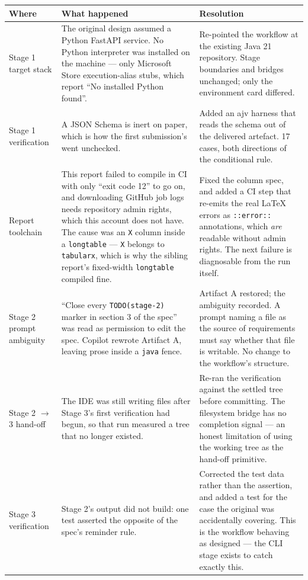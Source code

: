 \documentclass[11pt,a4paper]{article}
\newcommand{\code}[1]{\texttt{\small #1}}
\begin{document}
\begin{table}[h]
\centering
\small
\begin{tabularx}{\textwidth}{@{}L{3.4cm} X L{3.6cm}@{}}
\toprule
\textbf{Where} & \textbf{What happened} & \textbf{Resolution} \\
\midrule
Stage 1 target stack
  & The original design assumed a Python FastAPI service. No Python
    interpreter was installed on the machine --- only Microsoft Store
    execution-alias stubs, which report ``No installed Python found''.
  & Re-pointed the workflow at the existing Java 21 repository. Stage
    boundaries and bridges unchanged; only the environment card differed. \\
\addlinespace
Stage 1 verification
  & A JSON Schema is inert on paper, which is how the first submission's went
    unchecked.
  & Added an ajv harness that reads the schema out of the delivered artefact.
    17 cases, both directions of the conditional rule. \\
\addlinespace
Report toolchain
  & This report failed to compile in CI with only ``exit code 12'' to go on,
    and downloading GitHub job logs needs repository admin rights, which this
    account does not have. The cause was an \code{X} column inside a
    \code{longtable} --- \code{X} belongs to \code{tabularx}, which is why the
    sibling report's fixed-width \code{longtable} compiled fine.
  & Fixed the column spec, and added a CI step that re-emits the real LaTeX
    errors as \code{::error::} annotations, which \emph{are} readable without
    admin rights. The next failure is diagnosable from the run itself. \\
\addlinespace
Stage 2 prompt ambiguity
  & ``Close every \code{TODO(stage-2)} marker in section 3 of the spec'' was
    read as permission to edit the spec. Copilot rewrote Artifact A, leaving
    prose inside a \code{java} fence.
  & Artifact A restored; the ambiguity recorded. A prompt naming a file as the
    source of requirements must say whether that file is writable. No change to
    the workflow's structure. \\
\addlinespace
Stage 2 $\rightarrow$ 3 hand-off
  & The IDE was still writing files after Stage 3's first verification had
    begun, so that run measured a tree that no longer existed.
  & Re-ran the verification against the settled tree before committing. The
    filesystem bridge has no completion signal --- an honest limitation of
    using the working tree as the hand-off primitive. \\
\addlinespace
Stage 3 verification
  & Stage 2's output did not build: one test asserted the opposite of the
    spec's reminder rule.
  & Corrected the test data rather than the assertion, and added a test for the
    case the original was accidentally covering. This is the workflow behaving
    as designed --- the CLI stage exists to catch exactly this. \\
\bottomrule
\end{tabularx}
\end{table}
\end{document}
